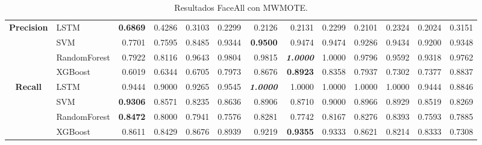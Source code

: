 \begin{table}[H]
\begin{adjustbox}{max width=14cm}
\begin{tabular}{|c|l|r|r|r|r|r|r|r|r|r|r|r|}
			\hline
			\textbf{Precision} & LSTM &  \textbf{0.6869} &  0.4286 &  0.3103 &  0.2299 &  0.2126 &  0.2131 &  0.2299 &  0.2101 &  0.2324 &  0.2024 &  0.3151 \\
			& SVM &  0.7701 &  0.7595 &  0.8485 &  0.9344 &  \textbf{0.9500} &  0.9474 &  0.9474 &  0.9286 &  0.9434 &  0.9200 &  0.9348 \\
			& RandomForest &  0.7922 &  0.8116 &  0.9643 &  0.9804 &  0.9815 &  \textit{\textbf{1.0000}} &  1.0000 &  0.9796 &  0.9592 &  0.9318 &  0.9762 \\
			& XGBoost &  0.6019 &  0.6344 &  0.6705 &  0.7973 &  0.8676 &  \textbf{0.8923} &  0.8358 &  0.7937 &  0.7302 &  0.7377 &  0.8837 \\
			\hline
			\textbf{Recall} & LSTM &  0.9444 &  0.9000 &  0.9265 &  0.9545 &  \textit{\textbf{1.0000}} &  1.0000 &  1.0000 &  1.0000 &  1.0000 &  0.9444 &  0.8846 \\
			& SVM &  \textbf{0.9306} &  0.8571 &  0.8235 &  0.8636 &  0.8906 &  0.8710 &  0.9000 &  0.8966 &  0.8929 &  0.8519 &  0.8269 \\
			& RandomForest &  \textbf{0.8472} &  0.8000 &  0.7941 &  0.7576 &  0.8281 &  0.7742 &  0.8167 &  0.8276 &  0.8393 &  0.7593 &  0.7885 \\
			& XGBoost &  0.8611 &  0.8429 &  0.8676 &  0.8939 &  0.9219 &  \textbf{0.9355} &  0.9333 &  0.8621 &  0.8214 &  0.8333 &  0.7308 \\
			\hline
		\end{tabular}
	\end{adjustbox}
	\caption{Resultados FaceAll con MWMOTE.}
	\label{tab:faceAllMWMOTE}
\end{table}

